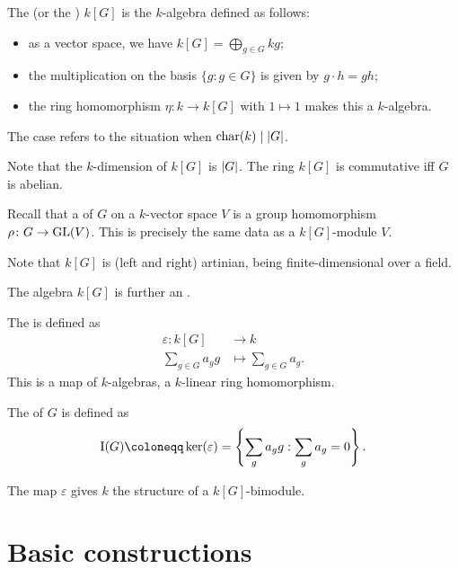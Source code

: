 \documentclass[12pt]{article}
\begin{document}
\begin{defn}
	The  (or the ) $k[G]$ is the $k$-algebra defined as follows:
	\begin{itemize}
		\item as a vector space, we have $k[G] = \bigoplus_{g \in G} kg$;
		\item the multiplication on the basis $\{g : g \in G\}$ is given by $g \cdot h = gh$;
		\item the ring homomorphism $\eta \colon k \to k[G]$ with $1 \mapsto 1$ makes this a $k$-algebra.
	\end{itemize}

	The  case refers to the situation when $\operatorname{char}(k) \mid {\left\lvert G \right\lvert}$.
\end{defn}
Note that the $k$-dimension of $k[G]$ is ${\left\lvert G \right\lvert}$. 
The ring $k[G]$ is commutative iff $G$ is abelian.

Recall that a  of $G$ on a $k$-vector space $V$ is a group homomorphism $\rho \colon G \to \operatorname{GL}(V)$. 
This is precisely the same data as a $k[G]$-module $V$. 

Note that $k[G]$ is (left and right) artinian, being finite-dimensional over a field. 

\begin{defn}
	The algebra $k[G]$ is further an .

	The  is defined as
	\begin{align*} 
		\varepsilon \colon k[G] & \to k \\
		\sum_{g \in G} a_{g} g & \mapsto \sum_{g \in G} a_{g}.
	\end{align*}
	This is a map of $k$-algebras, a $k$-linear ring homomorphism.

	The  of $G$ is defined as
	\begin{equation*} 
		\II(G) \coloneqq \ker(\varepsilon) = \left\{\sum_{g} a_{g} g : \sum_{g} a_{g} = 0\right\}.
	\end{equation*}
\end{defn}

\begin{defn}
	The map $\varepsilon$ gives $k$ the structure of a $k[G]$-bimodule.
\end{defn}

\section{Basic constructions}
\end{document}
